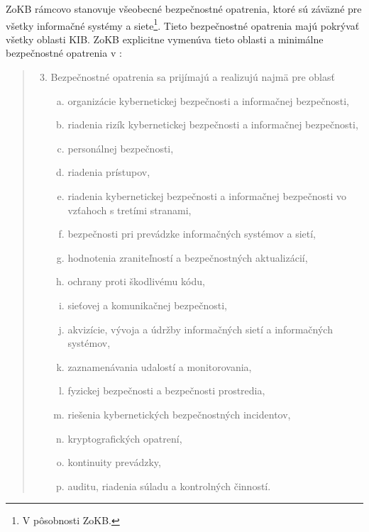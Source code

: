 \acrshort{ZoKB} rámcovo stanovuje všeobecné bezpečnostné opatrenia, ktoré sú záväzné pre všetky informačné systémy a
siete\footnote{V pôsobnosti ZoKB.}. Tieto bezpečnostné opatrenia majú pokrývať všetky oblasti KIB. ZoKB explicitne vymenúva
tieto oblasti a minimálne bezpečnostné opatrenia v \cite[\S 20]{69/2018}:
\begin{quote}
  \begin{enumerate}[(1)] \setcounter{enumi}{2}
    \item Bezpečnostné opatrenia sa prijímajú a realizujú najmä pre oblasť
      \begin{enumerate}[a)]
        \item organizácie kybernetickej bezpečnosti a informačnej bezpečnosti,
        \item riadenia rizík kybernetickej bezpečnosti a informačnej bezpečnosti,
        \item personálnej bezpečnosti,
        \item riadenia prístupov,
        \item riadenia kybernetickej bezpečnosti a informačnej bezpečnosti vo vzťahoch s tretími stranami,
        \item bezpečnosti pri prevádzke informačných systémov a sietí,
        \item hodnotenia zraniteľností a bezpečnostných aktualizácií,
        \item ochrany proti škodlivému kódu,
        \item sieťovej a komunikačnej bezpečnosti,
        \item akvizície, vývoja a údržby informačných sietí a informačných systémov,
        \item zaznamenávania udalostí a monitorovania,
        \item fyzickej bezpečnosti a bezpečnosti prostredia,
        \item riešenia kybernetických bezpečnostných incidentov,
        \item kryptografických opatrení,
        \item kontinuity prevádzky,
        \item auditu, riadenia súladu a kontrolných činností.
      \end{enumerate}


\end{enumerate}
\end{quote}
